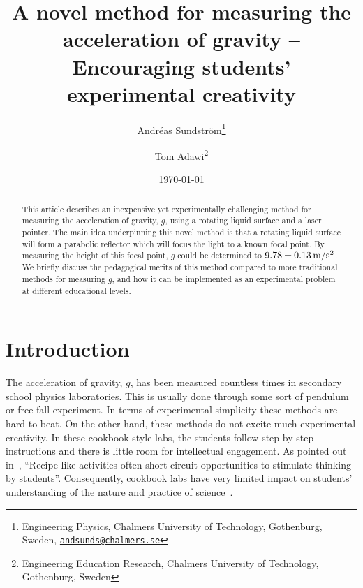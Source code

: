 \documentclass[11pt,
a4paper, 
swedish, english]{article}
\begin{document}
\title{A novel method for measuring the acceleration of gravity --
  Encouraging students' experimental creativity} 

\newcommand{\andsunds}{andsunds@chalmers.se}
\author{Andréas Sundström\footnote{Engineering Physics, Chalmers
    University of Technology, Gothenburg, Sweden,
    \textcolor{blue}{\href{mailto:\andsunds}{\nolinkurl{\andsunds}}} }
\and Tom Adawi\footnote{Engineering Education Research, Chalmers
  University of Technology, Gothenburg, Sweden} 
}
\date{\today}

\maketitle

\begin{abstract}
    This article describes an inexpensive yet experimentally
    challenging method for measuring the acceleration of gravity, $g$,
    using a rotating liquid surface and a laser pointer. The main idea
    underpinning this novel method is that a rotating liquid surface
    will form a parabolic reflector which will focus the light to a
    known focal point. By measuring the height of this focal point, $g$
    could be determined to $\unit[9.78 \pm 0.13]{m/s^2}$. We briefly discuss the
    pedagogical merits of this method compared to more traditional
    methods for measuring $g$, and how it can be implemented as an
    experimental problem at different educational levels. 
\end{abstract}





\section{Introduction}

The acceleration of gravity, $g$, has been measured countless times in
secondary school physics laboratories. This is usually done through
some sort of pendulum or free fall experiment. In terms of
experimental simplicity these methods are hard to beat. On the other
hand, these methods do not excite much experimental creativity. In
these cookbook-style labs, the students follow step-by-step
instructions and there is little room for intellectual engagement. As
pointed out in~\cite{Domin1999}, ``Recipe-like activities often short
circuit opportunities to stimulate thinking by
students''. Consequently, cookbook labs have very limited impact on
students' understanding of the nature and practice of
science~\cite{Domin1999}. 
\end{document}
